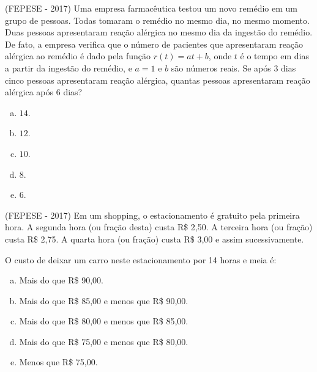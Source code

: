   \begin{exer}
  (FEPESE - 2017) Uma empresa farmacêutica testou um novo remédio em um grupo de pessoas. Todas tomaram o remédio no mesmo dia, no mesmo momento. Duas pessoas apresentaram reação alérgica no mesmo dia da ingestão do remédio. De fato, a empresa verifica que o número de pacientes que apresentaram reação alérgica ao remédio é dado pela função $r(t) = a t + b$, onde $t$ é o tempo em dias a partir da ingestão do remédio, e $a= 1$ e $b$ são números reais. Se após $3$ dias cinco pessoas apresentaram reação alérgica, quantas pessoas apresentaram reação alérgica após $6$ dias?
 \begin{enumerate}[a)]
  \item $14$.
  \item $12$.
  \item $10$.
  \item $8$.
  \item $6$.
 \end{enumerate}
  \end{exer}
  
  \begin{exer}
  (FEPESE - 2017) Em um shopping, o estacionamento é gratuito pela primeira hora. A segunda hora (ou fração desta) custa R\$ 2,50. A terceira hora (ou fração) custa R\$ 2,75. A quarta hora (ou fração) custa R\$ 3,00 e assim sucessivamente.

 O custo de deixar um carro neste estacionamento por 14 horas e meia é:
 \begin{enumerate}[a)]
  \item Mais do que R\$ 90,00.
  \item Mais do que R\$ 85,00 e menos que R\$ 90,00.
  \item Mais do que R\$ 80,00 e menos que R\$ 85,00.
  \item Mais do que R\$ 75,00 e menos que R\$ 80,00.
  \item Menos que R\$ 75,00.
 \end{enumerate}
  \end{exer}
  
